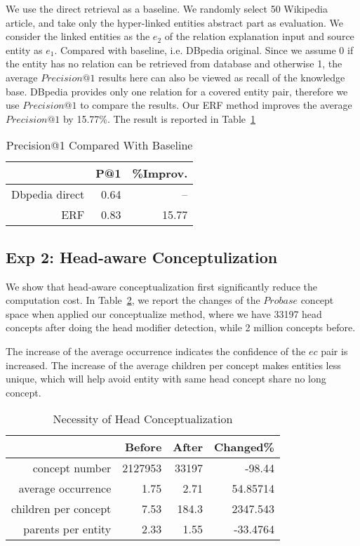 We use the direct retrieval as a baseline.
We randomly select 50 Wikipedia article, and take only the hyper-linked entities abstract part as evaluation.
We consider the linked entities as the $e_2$ of the relation explanation input and source entity as $e_1$.
Compared with baseline, i.e. DBpedia original.
Since we assume 0 if the entity has no relation can be retrieved from database and otherwise 1, the average $Precision@1$ results here can also be viewed as \ac{recall} of the knowledge base.
DBpedia provides only one relation for a covered entity pair, therefore we use $Precision@1$ to compare the results.
Our ERF method improves the average $Precision@1$ by 15.77\%.
The result is reported in Table~\ref{tab:precision_compare}

\begin{table}[htbp]
  \centering
  \caption{Precision@1 Compared With Baseline}
    \begin{tabular}{rrr}
    \toprule
         & P@1  & \%Improv. \\
    \midrule
    Dbpedia direct & 0.64 & -- \\
    ERF  & 0.83 & 15.77 \\
    \bottomrule
    \end{tabular}%
  \label{tab:precision_compare}%
\end{table}%






\subsection{Exp 2: Head-aware Conceptulization}
We show that head-aware conceptualization first significantly reduce the computation cost. 
In Table~\ref{tab:nhc}, we report the changes of the $Probase$ concept space when applied our conceptualize method, where we have 33197 head concepts after doing the head modifier detection, while 2 million concepts before.

The increase of the average occurrence indicates the confidence of the $e$\isa$c$ pair is increased.
The increase of the average children per concept makes entities less unique, which will help avoid entity with same head concept share no long concept.

\begin{table}[htbp]
  \centering
  \caption{Necessity of Head Conceptualization}
    \begin{tabular}{rrrr}
    \toprule
          & Before & After & Changed\% \\
    \midrule
    concept number & 2127953 & 33197 & -98.44 \\
    average occurrence & 1.75  & 2.71  & 54.85714 \\
    children per concept & 7.53  & 184.3 & 2347.543 \\
    parents per entity & 2.33  & 1.55  & -33.4764 \\
    \bottomrule
    \end{tabular}%
  \label{tab:nhc}%
\end{table}%


